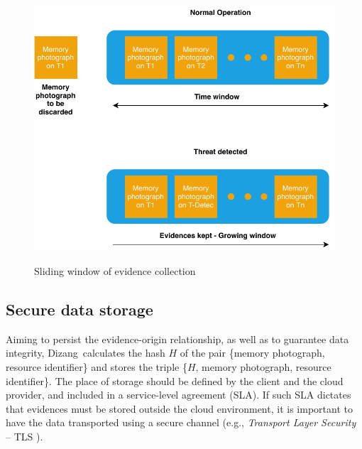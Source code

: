 \documentclass[10pt,journal,compsoc]{IEEEtran}
\newcommand{\fancyname}{Dizang}
\begin{document}
\begin{figure}[tb!]
\footnotesize
\caption{Sliding window of evidence collection}
\includegraphics[center,scale=0.70]{janela_ieee-eng.pdf}
\centering
\label{fig:janela}
\end{figure}



\subsection{Secure data storage}
\label{sec:proposal-desc-memcpy}


%
Aiming to persist the evidence-origin relationship, as well as to guarantee data integrity, \fancyname\ calculates the hash $H$ of the pair \{memory photograph, resource identifier\} and stores the triple \{$H$, memory photograph, resource identifier\}.
%
The place of storage should be defined by the client and the cloud provider, and included in a service-level agreement (SLA).
%
If such SLA dictates that evidences must be stored outside the cloud environment, it is important to have the data transported using a secure channel (e.g., \textit{Transport Layer Security} – TLS \cite{DierksT2008}).

\end{document}
